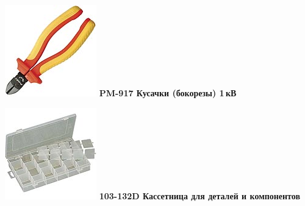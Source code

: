 \documentclass{magazine}
\begin{document}
{\noindent\includegraphics[width=\columnwidth]{fig/00/pros/PM-917.jpg}
\textbf{PM-917 Кусачки (бокорезы) 1\,кВ}


\noindent\includegraphics[width=\columnwidth]{fig/00/pros/103-132D.jpg}
\textbf{103-132D Кассетница для деталей и компонентов}

}
\end{document}
